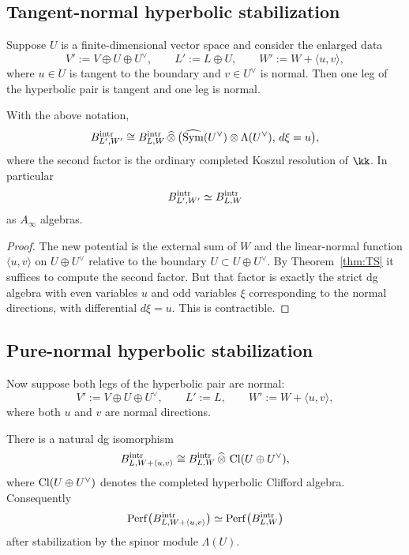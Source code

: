 \subsection{Tangent-normal hyperbolic stabilization}

Suppose $U$ is a finite-dimensional vector space and consider the enlarged data
\[
V':=V\oplus U\oplus U^\vee,
\qquad
L':=L\oplus U,
\qquad
W':=W+\langle u,v\rangle,
\]
where $u\in U$ is tangent to the boundary and $v\in U^\vee$ is normal. Then one leg of the hyperbolic pair is tangent and one leg is normal.

\begin{theorem}%
With the above notation,
\[
B^{\mathrm{intr}}_{L',W'}
\cong
B^{\mathrm{intr}}_{L,W}\,\widehat{\otimes}\,
\bigl(\widehat{\operatorname{Sym}}(U^\vee)\otimes \Lambda(U^\vee),\, d\xi=u\bigr),
\]
where the second factor is the ordinary completed Koszul resolution of $\kk$. In particular
\[
B^{\mathrm{intr}}_{L',W'}\simeq B^{\mathrm{intr}}_{L,W}
\]
as $A_\infty$ algebras.
\end{theorem}

\begin{proof}
The new potential is the external sum of $W$ and the linear-normal function $\langle u,v\rangle$ on $U\oplus U^\vee$ relative to the boundary $U\subset U\oplus U^\vee$. By Theorem~\ref{thm:TS} it suffices to compute the second factor. But that factor is exactly the strict dg algebra with even variables $u$ and odd variables $\xi$ corresponding to the normal directions, with differential $d\xi=u$. This is contractible.
\end{proof}

\subsection{Pure-normal hyperbolic stabilization}

Now suppose both legs of the hyperbolic pair are normal:
\[
V' := V\oplus U\oplus U^\vee,
\qquad
L' := L,
\qquad
W' := W+\langle u,v\rangle,
\]
where both $u$ and $v$ are normal directions.

\begin{theorem}%
There is a natural dg isomorphism
\[
B^{\mathrm{intr}}_{L,W+\langle u,v\rangle}
\cong
B^{\mathrm{intr}}_{L,W}\,\widehat{\otimes}\, \operatorname{Cl}(U\oplus U^\vee),
\]
where $\operatorname{Cl}(U\oplus U^\vee)$ denotes the completed hyperbolic Clifford algebra. Consequently
\[
\operatorname{Perf}\bigl(B^{\mathrm{intr}}_{L,W+\langle u,v\rangle}\bigr)
\simeq
\operatorname{Perf}\bigl(B^{\mathrm{intr}}_{L,W}\bigr)
\]
after stabilization by the spinor module $\Lambda(U)$.
\end{theorem}

